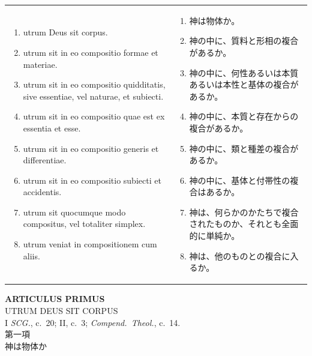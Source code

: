 \documentclass[paper=a4paper,fontsize=10pt,jafontsize=9pt,titlepage]{jlreq}
\begin{document}
\begin{longtable}{p{21em}p{21em}}
\begin{enumerate}
 \item utrum Deus sit corpus.
 \item utrum sit in eo compositio formae et materiae. 
 \item utrum sit in eo compositio quidditatis, sive
essentiae, vel naturae, et subiecti.
 \item utrum sit in eo compositio quae est ex essentia et esse.
 \item utrum sit in eo compositio generis et differentiae. 
 \item utrum sit in eo compositio subiecti et accidentis.
 \item utrum sit quocumque modo compositus, vel totaliter
simplex.
 \item utrum veniat in compositionem cum aliis.
\end{enumerate}

&

\begin{enumerate}
 \item 神は物体か。
 \item 神の中に、質料と形相の複合があるか。
 \item 神の中に、何性あるいは本質あるいは本性と基体の複合があるか。
 \item 神の中に、本質と存在からの複合があるか。
 \item 神の中に、類と種差の複合があるか。
 \item 神の中に、基体と付帯性の複合はあるか。
 \item 神は、何らかのかたちで複合されたものか、それとも全面的に単純か。
 \item 神は、他のものとの複合に入るか。
\end{enumerate}


\end{longtable}

\newpage
{}
\begin{center}
 {\Large {\bfseries ARTICULUS PRIMUS}}\\
 {\large UTRUM DEUS SIT CORPUS}\\
 {\footnotesize I {\itshape SCG.}, c.~20; II, c.~3; {\itshape Compend.~Theol.},
 c.~14.}\\
{\Large 第一項\\神は物体か}
\end{center}
\end{document}
